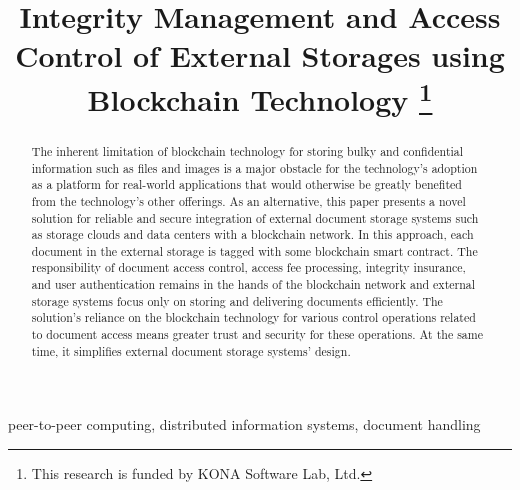 \documentclass[conference]{IEEEtran}
\begin{document}
\title{Integrity Management and Access Control of External Storages using Blockchain Technology 
	\thanks{This research is funded by KONA Software Lab, Ltd.}
}

\author{
	\and
	\and
}
\maketitle

\begin{abstract}
The inherent limitation of blockchain technology for storing bulky and confidential information such as files and images is a major obstacle for the technology's adoption as a platform for real-world applications that would otherwise be greatly benefited from the technology's other offerings. As an alternative, this paper presents a novel solution for reliable and secure integration of external document storage systems such as storage clouds and data centers with a blockchain network. In this approach, each document in the external storage is tagged with some blockchain smart contract. The responsibility of document access control, access fee processing, integrity insurance, and user authentication remains in the hands of the blockchain network and external storage systems focus only on storing and delivering documents efficiently. The solution's reliance on the blockchain technology for various control operations related to document access means greater trust and security for these operations. At the same time, it simplifies external document storage systems' design.    
\end{abstract}

\begin{IEEEkeywords}
peer-to-peer computing, distributed information systems, document handling  
\end{IEEEkeywords}








             

       



 


\end{document}
